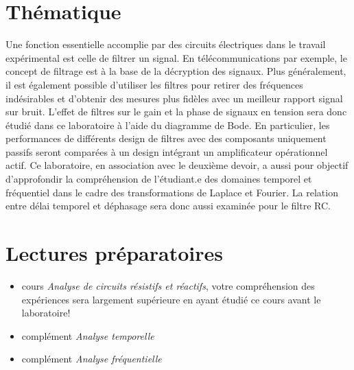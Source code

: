 \documentclass[canadien,12pt,oneside,letterpaper]{article}
\begin{document}
\section{Thématique}\label{sec:theme}
\vspace{-1.5ex}
Une fonction essentielle accomplie par des circuits électriques dans le travail expérimental est celle de filtrer un signal. En télécommunications par exemple, le concept de filtrage est à la base de la décryption des signaux. Plus généralement, il est également possible d'utiliser les filtres pour retirer des fréquences indésirables et d'obtenir des mesures plus fidèles avec un meilleur rapport signal sur bruit. L’effet de filtres sur le gain et la phase de signaux en tension sera donc étudié dans ce laboratoire à l’aide du diagramme de Bode. En particulier, les performances de différents design de filtres avec des composants uniquement passifs seront comparées à un design intégrant un amplificateur opérationnel actif. Ce laboratoire, en association avec le deuxième devoir, a aussi pour objectif d’approfondir la compréhension de l’étudiant.e des domaines temporel et fréquentiel dans le cadre des transformations de Laplace et Fourier. La relation entre délai temporel et déphasage sera donc aussi examinée pour le filtre RC.\\

\vspace{-2ex}
\section{Lectures préparatoires}\label{sec:lectures}

\begin{itemize}
\item cours \textit{Analyse de circuits résistifs et réactifs}, votre compréhension des expériences sera largement supérieure en ayant étudié ce cours avant le laboratoire!
\item complément \textit{Analyse temporelle}
\item complément \textit{Analyse fréquentielle}
\end{itemize}


\vspace{-2ex}
\end{document}
